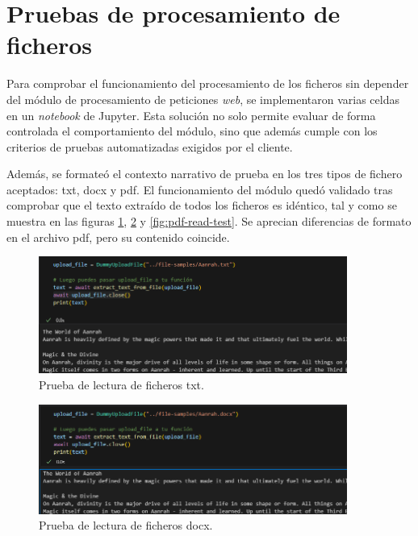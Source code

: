 
\section{Pruebas de procesamiento de ficheros}
Para comprobar el funcionamiento del procesamiento de los ficheros sin depender del módulo de procesamiento de peticiones \textit{web},
se implementaron varias celdas en un \textit{notebook} de Jupyter.
Esta solución no solo permite evaluar de forma controlada el comportamiento del módulo,
sino que además cumple con los criterios de pruebas automatizadas exigidos por el cliente.

Además, se formateó el contexto narrativo de prueba en los tres tipos de fichero aceptados: txt, docx y pdf.
El funcionamiento del módulo quedó validado tras comprobar que el texto extraído de todos los ficheros es idéntico,
tal y como se muestra en las figuras \ref{fig:txt-read-test}, \ref{fig:docx-read-test} y \ref{fig:pdf-read-test}.
Se aprecian diferencias de formato en el archivo pdf, pero su contenido coincide.

\begin{figure}[htbp]
	\centering
	\includegraphics[width=0.9\textwidth]{./Figures/file-read-test-txt.png}
	\caption{Prueba de lectura de ficheros txt.}
	\label{fig:txt-read-test}
\end{figure}

\begin{figure}[htbp]
	\centering
	\includegraphics[width=0.9\textwidth]{./Figures/file-read-test-docx.png}
	\caption{Prueba de lectura de ficheros docx.}
	\label{fig:docx-read-test}
\end{figure}

